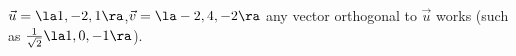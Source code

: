 {$\vec u = \la 1,-2,1\ra$,\quad $\vec v=\la -2,4,-2\ra$
}
{any vector orthogonal to $\vec u$ works (such as $\frac{1}{\sqrt{2}}\la 1,0,-1\ra$).
}
